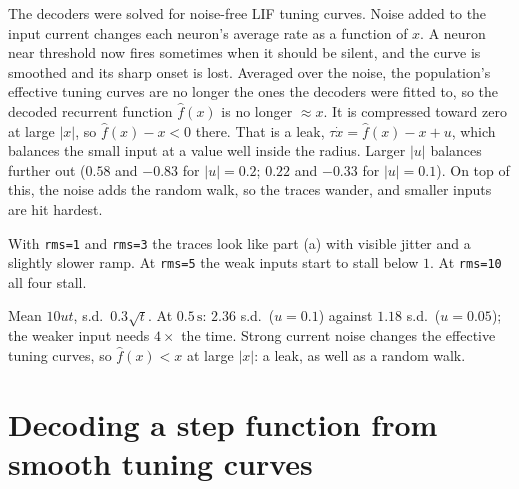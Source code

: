 \documentclass[11pt,letterpaper]{article}
\newcommand{\ans}[1]{\par\vspace{4pt}{\bfseries #1}\quad}
\begin{document}
\ans{Q2}
The decoders were solved for noise-free LIF tuning curves. Noise added to the input current changes each neuron's average rate as a function of $x$. A neuron near threshold now fires sometimes when it should be silent, and the curve is smoothed and its sharp onset is lost. Averaged over the noise, the population's effective tuning curves are no longer the ones the decoders were fitted to, so the decoded recurrent function $\hat f(x)$ is no longer $\approx x$. It is compressed toward zero at large $|x|$, so $\hat f(x) - x < 0$ there. That is a leak, $\tau\dot x = \hat f(x) - x + u$, which balances the small input at a value well inside the radius. Larger $|u|$ balances further out ($0.58$ and $-0.83$ for $|u| = 0.2$; $0.22$ and $-0.33$ for $|u| = 0.1$). On top of this, the noise adds the random walk, so the traces wander, and smaller inputs are hit hardest.
\begin{center}
\end{center}
With \texttt{rms=1} and \texttt{rms=3} the traces look like part (a) with visible jitter and a slightly slower ramp. At \texttt{rms=5} the weak inputs start to stall below $1$. At \texttt{rms=10} all four stall.
\begin{result}
Mean $10ut$, s.d.\ $0.3\sqrt t$. At $0.5\,\mathrm s$: $2.36$ s.d.\ ($u = 0.1$) against $1.18$ s.d.\ ($u = 0.05$); the weaker input needs $4\times$ the time. Strong current noise changes the effective tuning curves, so $\hat f(x) < x$ at large $|x|$: a leak, as well as a random walk.
\end{result}

\section{Decoding a step function from smooth tuning curves}
\end{document}
